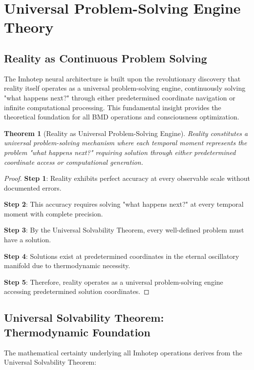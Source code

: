 \documentclass[12pt,a4paper]{article}
\newtheorem{theorem}{Theorem}[section]
\theoremstyle{remark}
\begin{document}
\section{Universal Problem-Solving Engine Theory}

\subsection{Reality as Continuous Problem Solving}

The Imhotep neural architecture is built upon the revolutionary discovery that reality itself operates as a universal problem-solving engine, continuously solving "what happens next?" through either predetermined coordinate navigation or infinite computational processing. This fundamental insight provides the theoretical foundation for all BMD operations and consciousness optimization.

\begin{theorem}[Reality as Universal Problem-Solving Engine]
Reality constitutes a universal problem-solving mechanism where each temporal moment represents the problem "what happens next?" requiring solution through either predetermined coordinate access or computational generation.
\end{theorem}

\begin{proof}
\textbf{Step 1}: Reality exhibits perfect accuracy at every observable scale without documented errors.

\textbf{Step 2}: This accuracy requires solving "what happens next?" at every temporal moment with complete precision.

\textbf{Step 3}: By the Universal Solvability Theorem, every well-defined problem must have a solution.

\textbf{Step 4}: Solutions exist at predetermined coordinates in the eternal oscillatory manifold due to thermodynamic necessity.

\textbf{Step 5}: Therefore, reality operates as a universal problem-solving engine accessing predetermined solution coordinates.
\end{proof}

\subsection{Universal Solvability Theorem: Thermodynamic Foundation}

The mathematical certainty underlying all Imhotep operations derives from the Universal Solvability Theorem:
\end{document}
